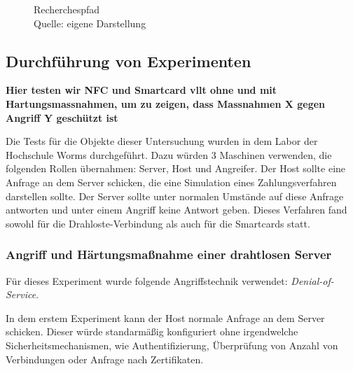 \begin{landscape}
  \thispagestyle{mylandscape}
  \begin{figure}[h]  
  \centering
         \caption{Recherchespfad\\ Quelle: eigene Darstellung}
          \label{fig:diagramfrage}
  \end{figure}
\end{landscape}


\subsection{Durchführung von Experimenten}
\textbf{Hier testen wir NFC und Smartcard vllt ohne und mit Hartungsmassnahmen, um zu zeigen, dass Massnahmen X gegen
Angriff Y geschützt ist}

Die Tests für die Objekte dieser Untersuchung wurden in dem Labor der Hochschule Worms durchgeführt. 
Dazu würden 3 Maschinen verwenden, die folgenden Rollen übernahmen: Server, Host und Angreifer. 
Der Host sollte eine Anfrage an dem Server schicken, die eine Simulation eines Zahlungsverfahren darstellen sollte.
Der Server sollte unter normalen Umstände auf diese Anfrage antworten und unter einem Angriff keine Antwort
geben. Dieses Verfahren fand sowohl für die Drahloste-Verbindung als auch für die Smartcards statt.


\subsubsection{Angriff und Härtungsmaßnahme einer drahtlosen Server}
Für dieses Experiment wurde folgende Angriffstechnik verwendet: \textit{Denial-of-Service}.

In dem erstem Experiment kann der Host normale Anfrage an dem Server schicken. Dieser würde standarmäßig konfiguriert
ohne irgendwelche Sicherheitsmechanismen, wie Authentifizierung, Überprüfung von Anzahl von Verbindungen oder Anfrage
nach Zertifikaten.

